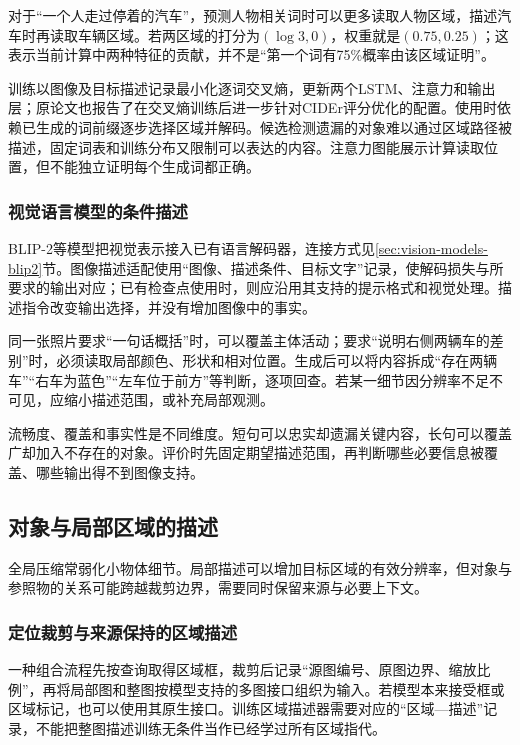 对于“一个人走过停着的汽车”，预测人物相关词时可以更多读取人物区域，描述汽车时再读取车辆区域。若两区域的打分为$(\log3,0)$，权重就是$(0.75,0.25)$；这表示当前计算中两种特征的贡献，并不是“第一个词有75\%概率由该区域证明”。

训练以图像及目标描述记录最小化逐词交叉熵，更新两个LSTM、注意力和输出层；原论文也报告了在交叉熵训练后进一步针对CIDEr评分优化的配置。使用时依赖已生成的词前缀逐步选择区域并解码。候选检测遗漏的对象难以通过区域路径被描述，固定词表和训练分布又限制可以表达的内容。注意力图能展示计算读取位置，但不能独立证明每个生成词都正确。

\subsubsection{视觉语言模型的条件描述}
\label{sec:vision-understanding-vlm-caption}

BLIP-2等模型把视觉表示接入已有语言解码器，连接方式见\ref{sec:vision-models-blip2}节。图像描述适配使用“图像、描述条件、目标文字”记录，使解码损失与所要求的输出对应；已有检查点使用时，则应沿用其支持的提示格式和视觉处理。描述指令改变输出选择，并没有增加图像中的事实。

同一张照片要求“一句话概括”时，可以覆盖主体活动；要求“说明右侧两辆车的差别”时，必须读取局部颜色、形状和相对位置。生成后可以将内容拆成“存在两辆车”“右车为蓝色”“左车位于前方”等判断，逐项回查。若某一细节因分辨率不足不可见，应缩小描述范围，或补充局部观测。

流畅度、覆盖和事实性是不同维度。短句可以忠实却遗漏关键内容，长句可以覆盖广却加入不存在的对象。评价时先固定期望描述范围，再判断哪些必要信息被覆盖、哪些输出得不到图像支持。

\subsection{对象与局部区域的描述}
\label{sec:vision-understanding-region-caption}

全局压缩常弱化小物体细节。局部描述可以增加目标区域的有效分辨率，但对象与参照物的关系可能跨越裁剪边界，需要同时保留来源与必要上下文。

\subsubsection{定位裁剪与来源保持的区域描述}
\label{sec:vision-understanding-crop-caption}

一种组合流程先按查询取得区域框，裁剪后记录“源图编号、原图边界、缩放比例”，再将局部图和整图按模型支持的多图接口组织为输入。若模型本来接受框或区域标记，也可以使用其原生接口。训练区域描述器需要对应的“区域—描述”记录，不能把整图描述训练无条件当作已经学过所有区域指代。

